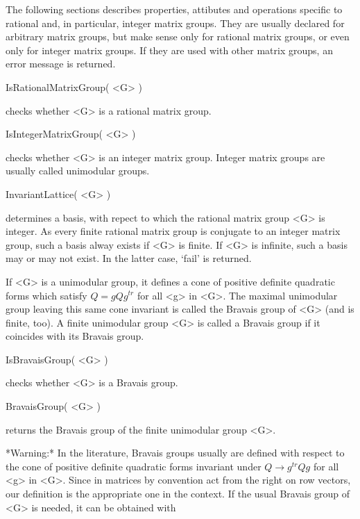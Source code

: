 



The following sections describes properties, attibutes and operations
specific to rational and, in particular, integer matrix groups. They
are usually declared for arbitrary matrix groups, but make sense only
for rational matrix groups, or even only for integer matrix groups.
If they are used with other matrix groups, an error message is
returned.

\> IsRationalMatrixGroup( <G> ) 

checks whether <G> is a rational matrix group.

\> IsIntegerMatrixGroup( <G> )

checks whether <G> is an integer matrix group. Integer matrix
groups are usually called unimodular groups.

\> InvariantLattice( <G> )

determines a basis, with repect to which the rational matrix group
<G> is integer. As every finite rational matrix group is conjugate 
to an integer matrix group, such a basis alway exists if <G> is
finite. If <G> is infinite, such a basis may or may not exist.
In the latter case, `fail' is returned.



If <G> is a unimodular group, it defines a cone of positive definite 
quadratic forms which satisfy $Q = g Q g^{tr}$ for all <g> in <G>. 
The maximal unimodular group leaving this same cone invariant is
called the Bravais group of <G> (and is finite, too).  A finite 
unimodular group <G> is called a Bravais group if it coincides 
with its Bravais group.

\> IsBravaisGroup( <G> )

checks whether <G> is a Bravais group. 

\> BravaisGroup( <G> )

returns the Bravais group of the finite unimodular group <G>.

*Warning:* In the literature, Bravais groups usually are defined with
respect to the cone of positive definite quadratic forms invariant
under $Q \to g^{tr} Q g$ for all <g> in <G>. Since in {\GAP} matrices 
by convention act from the right on row vectors, our definition is
the appropriate one in the {\GAP} context. If the usual Bravais group
of <G> is needed, it can be obtained with

